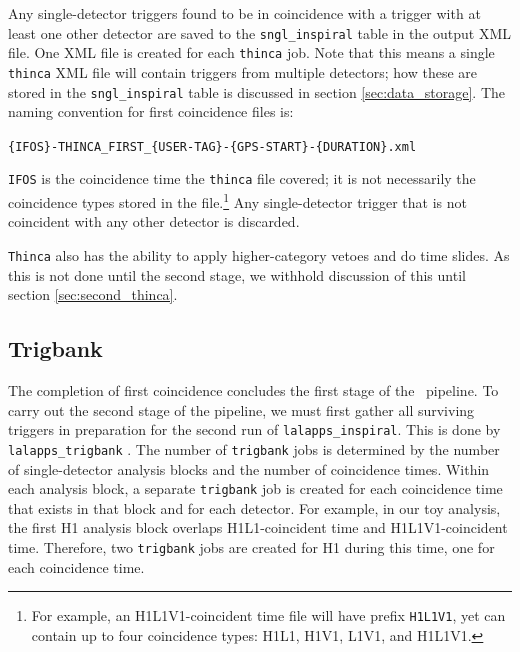 Any single-detector triggers found to be in coincidence with a trigger with at
least one other detector are saved to the \texttt{sngl\_inspiral} table in the
output XML file.  One XML file is created for each \texttt{thinca} job. Note
that this means a single \texttt{thinca} XML file will contain triggers from
multiple detectors; how these are stored in the \texttt{sngl\_inspiral} table
is discussed in section \ref{sec:data_storage}. The naming convention for first
coincidence files is:
\begin{center}
\texttt{\{IFOS\}-THINCA\_FIRST\_\{USER-TAG\}-\{GPS-START\}-\{DURATION\}.xml}
\end{center}
\texttt{IFOS} is the coincidence time the \texttt{thinca} file
covered; it is not necessarily the coincidence types stored in the
file.\footnote{For example, an H1L1V1-coincident time file will have prefix
\texttt{H1L1V1}, yet can contain up to four coincidence types: H1L1, H1V1,
L1V1, and H1L1V1.} Any single-detector trigger that is not coincident with any
other detector is discarded.

\texttt{Thinca} also has the ability to apply higher-category vetoes and do
time slides. As this is not done until the second stage, we withhold discussion
of this until section \ref{sec:second_thinca}.

\subsection{Trigbank}
\label{sec:tribank}

The completion of first coincidence concludes the first stage of the
\hipe~pipeline. To carry out the second stage of the pipeline, we must first
gather all surviving triggers in preparation for the second run of
\texttt{lalapps\_inspiral}. This is done by \texttt{lalapps\_trigbank}
\cite{brown-2005-22}. The number of \texttt{trigbank} jobs is determined by the
number of single-detector analysis blocks and the number of coincidence times.
Within each analysis block, a separate \texttt{trigbank} job is created for
each coincidence time that exists in that block and for each detector. For
example, in our toy analysis, the first H1 analysis block overlaps
H1L1-coincident time and H1L1V1-coincident time. Therefore, two
\texttt{trigbank} jobs are created for H1 during this time, one for each
coincidence time.

